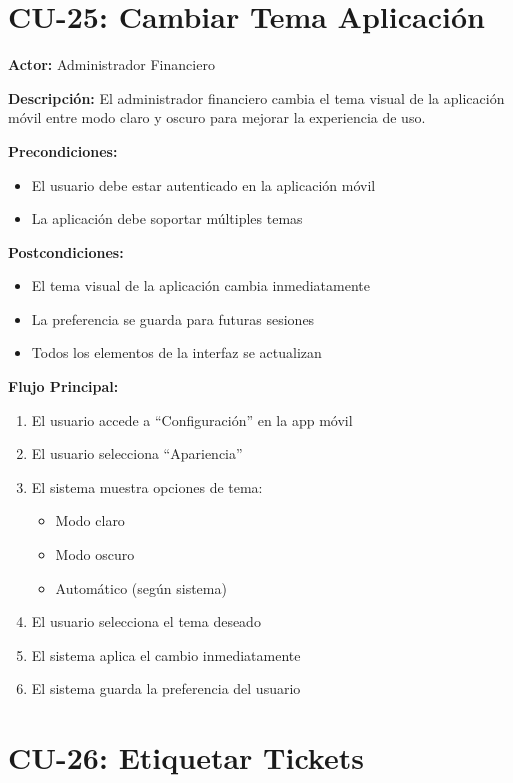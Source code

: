 \section{CU-25: Cambiar Tema Aplicación}

\noindent\textbf{Actor:} Administrador Financiero

\noindent\textbf{Descripción:} El administrador financiero cambia el tema visual de la aplicación móvil entre modo claro y oscuro para mejorar la experiencia de uso.

\noindent\textbf{Precondiciones:}
\begin{itemize}
    \item El usuario debe estar autenticado en la aplicación móvil
    \item La aplicación debe soportar múltiples temas
\end{itemize}

\noindent\textbf{Postcondiciones:}
\begin{itemize}
    \item El tema visual de la aplicación cambia inmediatamente
    \item La preferencia se guarda para futuras sesiones
    \item Todos los elementos de la interfaz se actualizan
\end{itemize}

\noindent\textbf{Flujo Principal:}
\begin{enumerate}
    \item El usuario accede a ``Configuración'' en la app móvil
    \item El usuario selecciona ``Apariencia''
    \item El sistema muestra opciones de tema:
    \begin{itemize}
        \item Modo claro
        \item Modo oscuro
        \item Automático (según sistema)
    \end{itemize}
    \item El usuario selecciona el tema deseado
    \item El sistema aplica el cambio inmediatamente
    \item El sistema guarda la preferencia del usuario
\end{enumerate}

\section{CU-26: Etiquetar Tickets}

